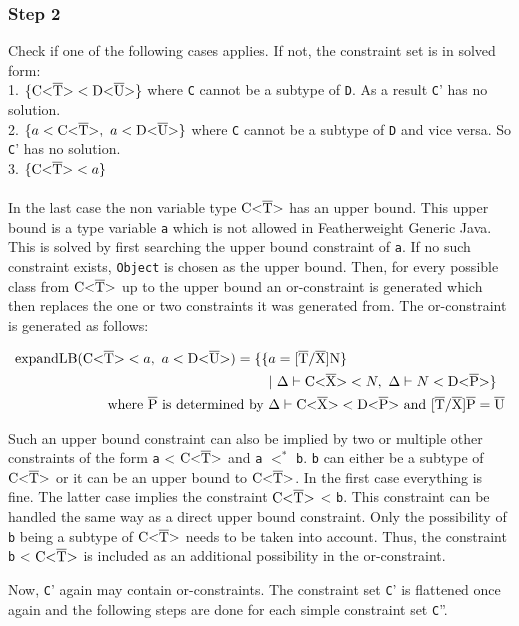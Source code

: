 \subsubsection{Step 2}
Check if one of the following cases applies. If not, the constraint set is in solved form:\\
1. $\{ \text{C<}\overline{\text{T}}\text{>} < \text{D<}\overline{\text{U}}\text{>} \}$ where \verb|C| cannot be a subtype of \verb|D|. As a result \verb|C|' has no solution.\\
2. $\{ a < \text{C<}\overline{\text{T}}\text{>}, \ a < \text{D<}\overline{\text{U}}\text{>} \}$ where \verb|C| cannot be a subtype of \verb|D| and vice versa. So \verb|C|' has no solution.\\
3. $\{ \text{C<}\overline{\text{T}}\text{>} < a \}$\\
\\
In the last case the non variable type $\text{C<}\overline{\text{T}}\text{>}$ has an upper bound. This upper bound is a type variable \verb|a| which is not allowed in Featherweight Generic Java.
This is solved by first searching the upper bound constraint of \verb|a|. If no such constraint exists, \verb|Object| is chosen as the upper bound. Then, for every possible class
from $\text{C<}\overline{\text{T}}\text{>}$ up to the upper bound an or-constraint is generated which then replaces the one or two constraints it was generated from.
The or-constraint is generated as follows:

\begin{align*}
    \text{expandLB} ( \text{C<}\overline{\text{T}}\text{>} < a, \ a < \text{D<}\overline{\text{U}}\text{>} ) = \{ \{ &a = \text{[}\overline{\text{T}}/\overline{\text{X}}\text{]N} \} \\
     &| \ \Delta \vdash \text{C<}\overline{\text{X}}\text{>} < N, \ \Delta \vdash N < \text{D<}\overline{\text{P}}\text{>} \}\\
    \text{where} \ \overline{\text{P}} \ \text{is determined by } & \Delta \vdash \text{C<}\overline{\text{X}}\text{>} < \text{D<}\overline{\text{P}}\text{>} \ \text{and} \ \text{[}\overline{\text{T}}/\overline{\text{X}}\text{]}\overline{\text{P}} = \overline{\text{U}}\\
\end{align*}

Such an upper bound constraint can also be implied by two or multiple other constraints of the form \verb|a| < $\text{C<}\overline{\text{T}}\text{>}$ and \verb|a| $<^*$ \verb|b|. \verb|b| can either be a subtype of $\text{C<}\overline{\text{T}}\text{>}$ or it can be an upper bound to $\text{C<}\overline{\text{T}}\text{>}$. In the first case everything is fine.
The latter case implies the constraint $\text{C<}\overline{\text{T}}\text{>}$ < \verb|b|. This constraint can be handled the same way as a direct upper bound constraint. Only the possibility of \verb|b| being a subtype of $\text{C<}\overline{\text{T}}\text{>}$ needs to be taken into account. Thus, the constraint \verb|b| < $\text{C<}\overline{\text{T}}\text{>}$ is included as an additional possibility in the or-constraint.

Now, \verb|C|' again may contain or-constraints. The constraint set \verb|C|' is flattened once again and the following steps are done for each simple constraint set \verb|C|''.

